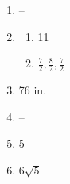 \documentclass{article}
\begin{document}
\begin{enumerate}
\begin{enumerate}
	\item Sometimes
	
	\item Always
	
	\item Sometimes
	
	\item Sometimes
	
	\item Always
	
	\item Never
	
	\item Sometimes
	
	\item Always
	
	\item Always
	
	\end{enumerate}

\item --

\item 

	\begin{enumerate}
	
	\item 11
	
	\item $\frac{7}{2}, \frac{8}{2}, \frac{7}{2}$
	
	\end{enumerate}
	
\item 76 in.

\item --

\item 5

\item $6\sqrt{5}$

\end{enumerate}
\end{document}
